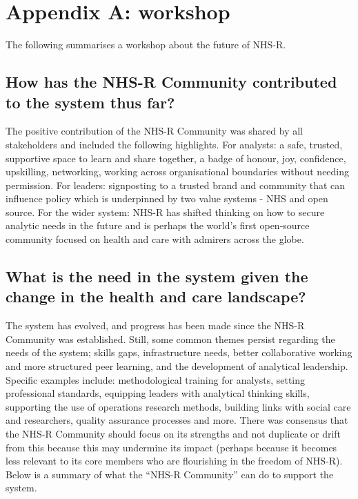 \documentclass[
]{book}
\begin{document}
\hypertarget{appendix-a-workshop}{%
\section{Appendix A: workshop}\label{appendix-a-workshop}}

The following summarises a workshop about the future of NHS-R.

\hypertarget{how-has-the-nhs-r-community-contributed-to-the-system-thus-far}{%
\subsection{How has the NHS-R Community contributed to the system thus far?}\label{how-has-the-nhs-r-community-contributed-to-the-system-thus-far}}

The positive contribution of the NHS-R Community was shared by all stakeholders and included the following highlights. For analysts: a safe, trusted, supportive space to learn and share together, a badge of honour, joy, confidence, upskilling, networking, working across organisational boundaries without needing permission. For leaders: signposting to a trusted brand and community that can influence policy which is underpinned by two value systems - NHS and open source. For the wider system: NHS-R has shifted thinking on how to secure analytic needs in the future and is perhaps the world's first open-source community focused on health and care with admirers across the globe.

\hypertarget{what-is-the-need-in-the-system-given-the-change-in-the-health-and-care-landscape}{%
\subsection{What is the need in the system given the change in the health and care landscape?}\label{what-is-the-need-in-the-system-given-the-change-in-the-health-and-care-landscape}}

The system has evolved, and progress has been made since the NHS-R Community was established. Still, some common themes persist regarding the needs of the system; skills gaps, infrastructure needs, better collaborative working and more structured peer learning, and the development of analytical leadership. Specific examples include: methodological training for analysts, setting professional standards, equipping leaders with analytical thinking skills, supporting the use of operations research methods, building links with social care and researchers, quality assurance processes and more. There was consensus that the NHS-R Community should focus on its strengths and not duplicate or drift from this because this may undermine its impact (perhaps because it becomes less relevant to its core members who are flourishing in the freedom of NHS-R). Below is a summary of what the ``NHS-R Community'' can do to support the system.
\end{document}
